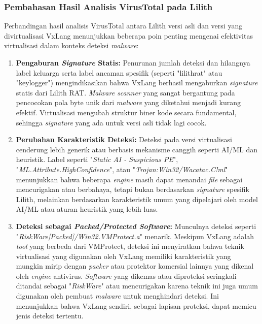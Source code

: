 \subsubsection{Pembahasan Hasil Analisis VirusTotal pada Lilith}
Perbandingan hasil analisis VirusTotal antara Lilith versi asli dan versi yang divirtualisasi VxLang menunjukkan beberapa poin penting mengenai efektivitas virtualisasi dalam konteks deteksi \textit{malware}:
\begin{enumerate}
    \item \textbf{Pengaburan \textit{Signature} Statis:} Penurunan jumlah deteksi dan hilangnya label keluarga serta label ancaman spesifik (seperti "lilithrat" atau "keylogger") mengindikasikan bahwa VxLang berhasil mengaburkan \textit{signature} statis dari Lilith RAT. \textit{Malware scanner} yang sangat bergantung pada pencocokan pola byte unik dari \textit{malware} yang diketahui menjadi kurang efektif. Virtualisasi mengubah struktur biner kode secara fundamental, sehingga \textit{signature} yang ada untuk versi asli tidak lagi cocok.

    \item \textbf{Perubahan Karakteristik Deteksi:} Deteksi pada versi virtualisasi cenderung lebih generik atau berbasis mekanisme canggih seperti AI/ML dan heuristik. Label seperti "\textit{Static AI - Suspicious PE}", "\textit{ML.Attribute.HighConfidence}", atau "\textit{Trojan:Win32/Wacatac.C!ml}" menunjukkan bahwa beberapa \textit{engine} masih dapat menandai \textit{file} sebagai mencurigakan atau berbahaya, tetapi bukan berdasarkan \textit{signature} spesifik Lilith, melainkan berdasarkan karakteristik umum yang dipelajari oleh model AI/ML atau aturan heuristik yang lebih luas.

    \item \textbf{Deteksi sebagai \textit{Packed/Protected Software}:} Munculnya deteksi seperti "\textit{RiskWare[Packed]/Win32.VMProtect.a}" menarik. Meskipun VxLang adalah \textit{tool} yang berbeda dari VMProtect, deteksi ini menyiratkan bahwa teknik virtualisasi yang digunakan oleh VxLang memiliki karakteristik yang mungkin mirip dengan \textit{packer} atau protektor komersial lainnya yang dikenal oleh \textit{engine} antivirus. \textit{Software} yang dikemas atau diproteksi seringkali ditandai sebagai "\textit{RiskWare}" atau mencurigakan karena teknik ini juga umum digunakan oleh pembuat \textit{malware} untuk menghindari deteksi. Ini menunjukkan bahwa VxLang sendiri, sebagai lapisan proteksi, dapat memicu jenis deteksi tertentu.


\end{enumerate}
